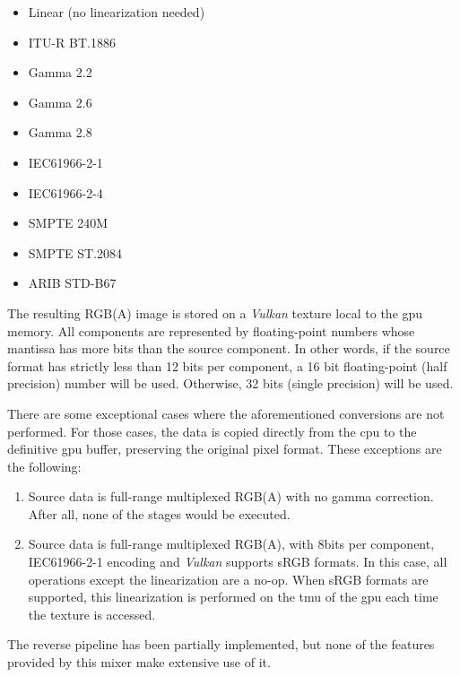 \documentclass[../main.tex]{subfiles}
\begin{document}
\begin{itemize}
    \item Linear (no linearization needed)
    \item ITU-R BT.1886\cite{bt1886}
    \item Gamma 2.2
    \item Gamma 2.6
    \item Gamma 2.8
    \item IEC61966-2-1\cite{iec61966-2-1}
    \item IEC61966-2-4\cite{iec61966-2-4}
    \item SMPTE 240M\cite{smpte240M} 
    \item SMPTE ST.2084\cite{smpte2084}
    \item ARIB STD-B67\cite{aribStdB67}
\end{itemize}

The resulting RGB(A) image is stored on a \textit{Vulkan} texture local to the \gls{gpu} memory. All components are represented by floating-point numbers whose mantissa has more bits than the source component. In other words, if the source format has strictly less than 12 bits per component, a 16 bit floating-point (half precision) number will be used. Otherwise, 32 bits (single precision) will be used\cite{ieee754}.\newline

There are some exceptional cases where the aforementioned conversions are not performed. For those cases, the data is copied directly from the \gls{cpu} to the definitive \gls{gpu} buffer, preserving the original pixel format. These exceptions are the following:

\begin{enumerate}[label=(\alph*)]
    \item Source data is full-range multiplexed RGB(A) with no gamma correction. After all, none of the stages would be executed.
    \item Source data is full-range multiplexed RGB(A), with 8bits per component, IEC61966-2-1 encoding and \textit{Vulkan} supports sRGB formats. In this case, all operations except the linearization are a no-op. When sRGB formats are supported, this linearization is performed on the \gls{tmu} of the \gls{gpu} each time the texture is accessed.
\end{enumerate}

The reverse pipeline has been partially implemented, but none of the features provided by this mixer make extensive use of it.\newline
\end{document}
